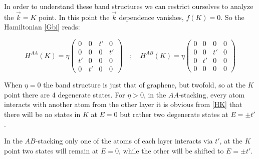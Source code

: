 In order to understand these band structures we can restrict ourselves to analyze the $\vec{k}=K$ point. In this point the $\vec{k}$ dependence vanishes, $f(K)=0$. So the Hamiltonian \eqref{Gbi} reads:

\begin{equation}
   H^{AA}(K) = \eta\left(\begin{array}{cc|cc}
         0 & 0 & t' & 0 \\
         0 & 0 & 0 & t' \\\hline
         t' & 0 & 0 & 0 \\
         0 & t' & 0 & 0
   \end{array}\right)\quad;\quad
   H^{AB}(K) = \eta\left(\begin{array}{c|cc|c}
         0 & 0 & 0 & 0 \\ \hline
         0 & 0 & t' & 0 \\
         0 & t' & 0 & 0 \\ \hline
         0 & 0 & 0 & 0
   \end{array}\right)
\label{HK}
\end{equation}

When $\eta=0$ the band structure is just that of graphene, but twofold, so at the $K$ point there are 4 degenerate states.
For $\eta>0$, in the $AA$-stacking, every atom interacts with another atom from the other layer it is obvious from \eqref{HK} that there will be no states in $K$ at $E=0$ but rather two degenerate states at $E=\pm t'$.

In the $AB$-stacking only one of the atoms of each layer interacts via $t'$, at the $K$ point two states will remain at $E=0$, while the other will be shifted to $E=\pm t'$.


